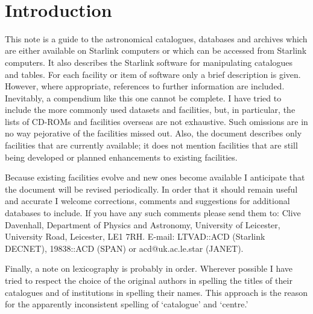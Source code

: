 \stardocabstract
 \newpage
 \begin{latexonly}
   \setlength{\parskip}{0mm}
   \latexonlytoc
   \setlength{\parskip}{\medskipamount}
   \markright{\stardocname}
 \end{latexonly}
\newpage
~
\newpage
\renewcommand{\thepage}{\arabic{page}}
\setcounter{page}{1}

\section{Introduction}

This note is a guide to the astronomical catalogues, databases and 
archives which are either available on Starlink computers or which can 
be accessed from Starlink computers. It also describes the Starlink 
software for manipulating catalogues and tables. For each facility or 
item of software only a brief description is given. However, where 
appropriate, references to further information are included. Inevitably,
a compendium like this one cannot be complete. I have tried to include 
the more commonly used datasets and facilities, but, in particular, the 
lists of CD-ROMs and facilities overseas are not exhaustive. Such 
omissions are in no way pejorative of the facilities missed out. Also,
the document describes only facilities that are currently available; it 
does not mention facilities that are still being developed or planned 
enhancements to existing facilities.

Because existing facilities evolve and new ones become available I 
anticipate that the document will be revised periodically. In order that
it should remain useful and accurate I welcome corrections, comments and
suggestions for additional databases to include. If you have any such 
comments please send them to: Clive Davenhall, Department of Physics and
Astronomy, University of Leicester, University Road, Leicester, LE1 7RH.
E-mail: LTVAD::ACD (Starlink DECNET), 19838::ACD (SPAN) or 
acd@uk.ac.le.star (JANET).

Finally, a note on lexicography is probably in order. Wherever possible
I have tried to respect the choice of the original authors in spelling
the titles of their catalogues and of institutions in spelling their 
names. This approach is the reason for the apparently inconsistent 
spelling of `catalogue' and `centre.'

